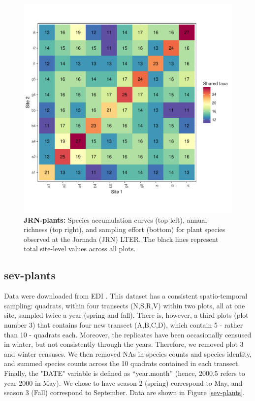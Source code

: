 \documentclass[11pt, oneside]{article}
\begin{document}
\begin{figure}[h!]
\includegraphics[scale = 0.4]{jrn-plants-compagnoni_spp_shared.pdf}
\caption{{\bf JRN-plants:} Species accumulation curves (top left),  annual richness (top right), and sampling effort (bottom)  for plant species observed at the Jornada (JRN) LTER. The black lines represent total site-level values across all plots.}
\label{jrn-plants}
\end{figure}

\subsection{sev-plants}
Data were downloaded from EDI \citep{sev-plants}.
This dataset has a consistent spatio-temporal sampling: quadrats, within four transects (N,S,R,V) within two plots, all at one site, sampled twice a year (spring and fall). 
There is, however, a third plots (plot number 3) that contains four new transect (A,B,C,D), which contain 5 - rather than 10 - quadrats each. 
Moreover, the replicates have been occasionally censused in winter, but not consistently through the years. 
Therefore, we removed plot 3 and winter censuses.
We then removed NAs in species counts and species identity, and summed species counts across the 10 quadrats contained in each transect. 
Finally, the "DATE" variable is defined as ``year.month'' (hence, 2000.5 refers to year 2000 in May). 
We chose to have season 2 (spring) correspond to May, and season 3 (Fall) correspond to September.
Data are shown in Figure \ref{sev-plants}.
\end{document}
